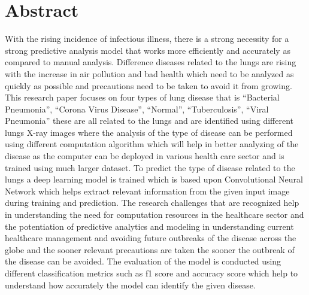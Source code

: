 \chapter*{\center \Large  Abstract}

With the rising incidence of infectious illness, there is a strong necessity for a strong 
predictive analysis model that works more efficiently and accurately as compared to manual 
analysis. Difference diseases related to the lungs are rising with the increase in air 
pollution and bad health which need to be analyzed as quickly as possible and precautions need 
to be taken to avoid it from growing. This research paper focuses on four types of lung disease 
that is “Bacterial Pneumonia”, “Corona Virus Disease”, “Normal”, “Tuberculosis”, “Viral 
Pneumonia” these are all related to the lungs and are identified using different lungs X-ray 
images where the analysis of the type of disease can be performed using different computation 
algorithm which will help in better analyzing of the disease as the computer can be deployed in 
various health care sector and is trained using much larger dataset. To predict the type of 
disease related to the lungs a deep learning model is trained which is based upon Convolutional 
Neural Network which helps extract relevant information from the given input image during 
training and prediction. The research challenges that are recognized help in understanding the 
need for computation resources in the healthcare sector and the potentiation of predictive 
analytics and modeling in understanding current healthcare management and avoiding future 
outbreaks of the disease across the globe and the sooner relevant precautions are taken the 
sooner the outbreak of the disease can be avoided. The evaluation of the model is conducted 
using different classification metrics such as f1 score and accuracy score which help to 
understand how accurately the model can identify the given disease. 

